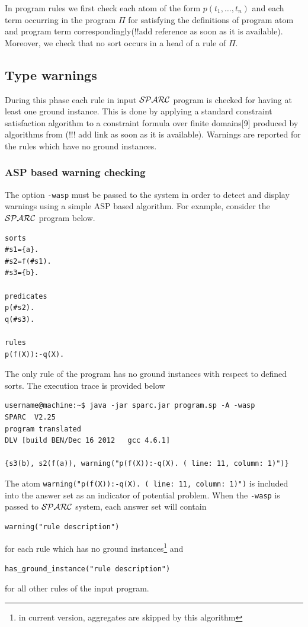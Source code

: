\documentclass[12pt, letterpaper]{article}
\begin{document}
In program rules we first check each atom of the form $p(t_1,\dots,t_n)$ and each term occurring in the program $\Pi$ for satisfying
the definitions of program atom and program term correspondingly(!!add reference as soon as it is available). Moreover, we check that no sort occurs in a head of a rule of $\Pi$.
\subsection{Type warnings}\label{type_warnings}
During this phase each rule in input ${\cal SPARC}$ program is checked for having at least one ground instance. This is done by applying a standard constraint
satisfaction algorithm to a constraint formula over finite domains[9] produced by algorithms from (!!! add link as soon as it is available).
Warnings are reported for the rules which have no ground instances.
\subsubsection{ASP based warning checking} \label{asp_type_warnings}
The option \texttt{-wasp} must be passed to the  system  in order to detect and display warnings using a simple ASP based algorithm.
For example, consider the ${\cal SPARC}$ program below.

\begin{verbatim}
sorts
#s1={a}.
#s2=f(#s1).
#s3={b}.

predicates
p(#s2).
q(#s3).

rules
p(f(X)):-q(X).
\end{verbatim}

The only rule of the program has no ground instances with respect to defined sorts.
The execution trace is provided below
\begin{verbatim}
username@machine:~$ java -jar sparc.jar program.sp -A -wasp
SPARC  V2.25
program translated
DLV [build BEN/Dec 16 2012   gcc 4.6.1]

{s3(b), s2(f(a)), warning("p(f(X)):-q(X). ( line: 11, column: 1)")}
\end{verbatim}

The atom \texttt{warning("p(f(X)):-q(X). ( line: 11, column: 1)")} is included into the answer set as an indicator of potential problem.
When the \texttt{-wasp} is passed to ${\cal SPARC}$ system, each answer set will contain 
\begin{verbatim}
warning("rule description") 
\end{verbatim}
for each rule which has no ground instances\footnote{in current version, aggregates are skipped by this algorithm} and 
\begin{verbatim}
has_ground_instance("rule description")
\end{verbatim}
\st
for all other rules of the input program.
\end{document}
